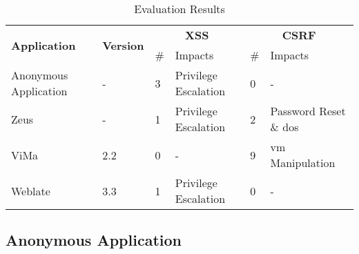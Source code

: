 
\begin{center}
\begin{table}[b]
  \caption{Evaluation Results}
  \vspace{-1.9mm}
  \begin{tabular}{|p{1.8cm}| l | lp{1.6cm}|lp{1.6cm}|}
    \hline
     \multirow{2}{*}{\textbf{Application}} &
        \multirow{2}{*}{\textbf{Version}} &
        \multicolumn{2}{c|}{\textbf{XSS}} &
        \multicolumn{2}{c|}{\textbf{CSRF}} \\ 
        & & {\#} &  {Impacts} & {\#}  & {Impacts} \\ \hline
        Anonymous Application & - & 3 & Privilege Escalation & 0 & - \\
        \hline
        Zeus & - & 1 & Privilege Escalation & 2 & Password Reset \& {\sc d}o{\sc s}  \\ \hline
        ViMa & 2.2 & 0 & - & 9 & {\sc vm} Manipulation \\ \hline
        Weblate & 3.3 & 1 & Privilege Escalation & 0 & - \\
    \hline
  \end{tabular}
  \label{tabular:apps}
\end{table}

\end{center}


\subsection{Anonymous Application}
\label{sec:okeanos}

